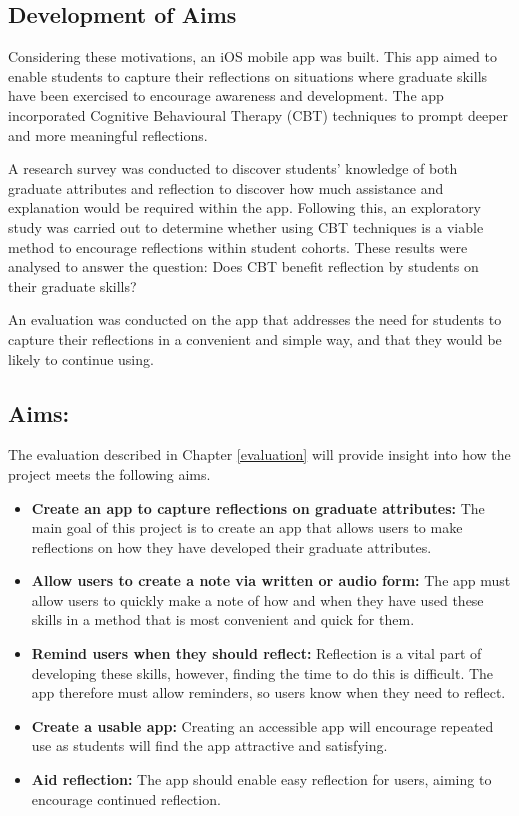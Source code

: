\documentclass{l4proj}
\begin{document}
\subsection{Development of Aims}

Considering these motivations, an iOS mobile app was built.  This app aimed to enable students to capture their reflections on situations where graduate skills have been exercised to encourage awareness and development. The app incorporated Cognitive Behavioural Therapy (CBT) techniques to prompt deeper and more meaningful reflections. 

A research survey was conducted to discover students' knowledge of both graduate attributes and reflection to discover how much assistance and explanation would be required within the app. Following this, an exploratory study was carried out to determine whether using CBT techniques is a viable method to encourage reflections within student cohorts. These results were analysed to answer the question: Does CBT benefit reflection by students on their graduate skills?

An evaluation was conducted on the app that addresses the need for students to capture their reflections in a convenient and simple way, and that they would be likely to continue using.

\subsection{Aims:}
The evaluation described in Chapter \ref{evaluation} will provide insight into how the project meets the following aims.
\begin{itemize}
    \item \textbf{Create an app to capture reflections on graduate attributes:} The main goal of this project is to create an app that allows users to make reflections on how they have developed their graduate attributes.
    \item \textbf{Allow users to create a note via written or audio form:} The app must allow users to quickly make a note of how and when they have used these skills in a method that is most convenient and quick for them.
    \item \textbf{Remind users when they should reflect:} Reflection is a vital part of developing these skills, however, finding the time to do this is difficult. The app therefore must allow reminders, so users know when they need to reflect.
    \item \textbf{Create a usable app:} Creating an accessible app will encourage repeated use as students will find the app attractive and satisfying.
    \item \textbf{Aid reflection:} The app should enable easy reflection for users, aiming to encourage continued reflection.
\end{itemize}
\end{document}
